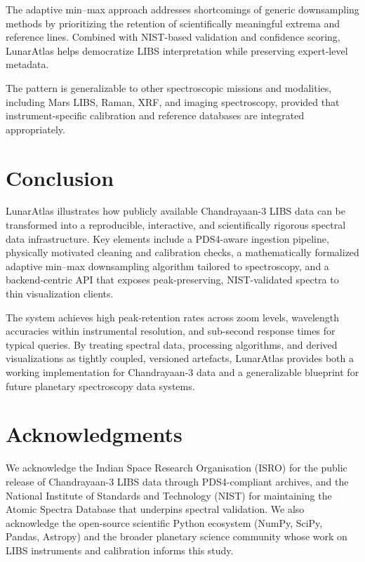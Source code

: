\documentclass[12pt,a4paper]{article}
\begin{document}
The adaptive min--max approach addresses shortcomings of generic downsampling methods by prioritizing the retention of scientifically meaningful extrema and reference lines. Combined with NIST-based validation and confidence scoring, LunarAtlas helps democratize LIBS interpretation while preserving expert-level metadata.

The pattern is generalizable to other spectroscopic missions and modalities, including Mars LIBS, Raman, XRF, and imaging spectroscopy, provided that instrument-specific calibration and reference databases are integrated appropriately.

\section{Conclusion}
\label{sec:conclusion}

LunarAtlas illustrates how publicly available Chandrayaan-3 LIBS data can be transformed into a reproducible, interactive, and scientifically rigorous spectral data infrastructure. Key elements include a PDS4-aware ingestion pipeline, physically motivated cleaning and calibration checks, a mathematically formalized adaptive min--max downsampling algorithm tailored to spectroscopy, and a backend-centric API that exposes peak-preserving, NIST-validated spectra to thin visualization clients.

The system achieves high peak-retention rates across zoom levels, wavelength accuracies within instrumental resolution, and sub-second response times for typical queries. By treating spectral data, processing algorithms, and derived visualizations as tightly coupled, versioned artefacts, LunarAtlas provides both a working implementation for Chandrayaan-3 data and a generalizable blueprint for future planetary spectroscopy data systems.

\section*{Acknowledgments}

We acknowledge the Indian Space Research Organisation (ISRO) for the public release of Chandrayaan-3 LIBS data through PDS4-compliant archives, and the National Institute of Standards and Technology (NIST) for maintaining the Atomic Spectra Database that underpins spectral validation. We also acknowledge the open-source scientific Python ecosystem (NumPy, SciPy, Pandas, Astropy) and the broader planetary science community whose work on LIBS instruments and calibration informs this study.
\end{document}
